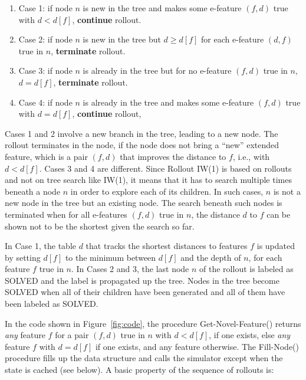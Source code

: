 \documentclass[letterpaper]{article}
\begin{document}
\begin{enumerate}[$\bullet$]
  \item Case 1: if node $n$ is new in the tree and makes some e-feature $(f,d)$ true with $d < d[f]$, \textbf{continue} rollout.
  \item Case 2: if node $n$ is new in the tree but $d \geq d[f]$ for each e-feature $(d,f)$ true in $n$, \textbf{terminate} rollout.
  \item Case 3: if node $n$ is already in the tree but for no e-feature $(f,d)$ true in $n$, $d = d[f]$, \textbf{terminate} rollout.
  \item Case 4: if node $n$ is already in the tree and makes some e-feature $(f,d)$ true with $d = d[f]$, \textbf{continue} rollout, 
\end{enumerate}

Cases 1 and 2 involve a  new branch in the tree, leading to a new node. The rollout terminates in the node, if the node  does not bring
a ``new'' extended feature, which is a pair $(f,d)$ that improves the distance to $f$, i.e., with  $d < d[f]$.
Cases 3 and 4 are different. Since Rollout IW(1) is based on rollouts and not on  tree search like IW(1), it means
that it has to search multiple times beneath a node $n$ in order to explore each of its children.
In such cases, $n$ is not a new node in the tree but an existing  node.
The  search beneath such  nodes is  terminated when for all e-features $(f,d)$ true in $n$,
the distance $d$ to $f$ can be shown not to be the shortest  given the search so far.

In Case 1, the table $d$ that tracks the shortest distances to features $f$ is updated
by setting $d[f]$ to  the minimum between  $d[f]$ and the depth of  $n$, for each feature $f$ true in $n$. 
In Cases 2 and 3, the last  node $n$ of the rollout is labeled as SOLVED and the label is propagated
up the tree. Nodes  in the tree become  SOLVED when all of their children have been
generated and all of them have been labeled as SOLVED.

In the code shown in  Figure~\ref{fig:code}, the procedure 
Get-Novel-Feature() returns \emph{any}  feature $f$ for a pair $(f,d)$ true in $n$
with $d < d[f]$,  if one exists, else  \emph{any}  feature $f$ with  $d=d[f]$ if one exists,
and any feature otherwise.  The Fill-Node() procedure fills up the data structure and
calls  the simulator except when the state is cached (see below). 
A basic property of the sequence of rollouts is:
\end{document}
